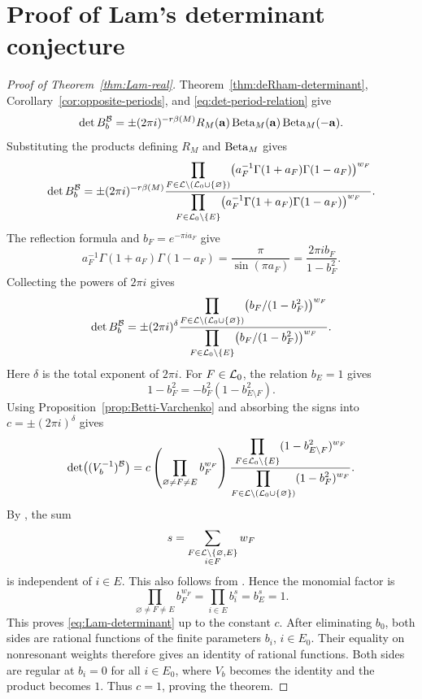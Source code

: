 \section{Proof of Lam's determinant conjecture}\label{sec:determinants}

\begin{proof}[Proof of Theorem~\ref{thm:Lam-real}]

Theorem~\ref{thm:deRham-determinant},
Corollary~\ref{cor:opposite-periods}, and
\eqref{eq:det-period-relation} give
\[
 \det B_b^{\mathcal B}
 =\pm(2\pi i)^{-r\beta(M)}
       R_M(\mathbf a)\operatorname{Beta}_M(\mathbf a)\operatorname{Beta}_M(-\mathbf a).
\]
Substituting the products defining $R_M$ and $\operatorname{Beta}_M$ gives
\[
 \det B_b^{\mathcal B}
 =\pm(2\pi i)^{-r\beta(M)}
 \frac{\displaystyle
   \prod_{F\in\mathcal L\setminus(\mathcal L_0\cup\{\varnothing\})}
      \bigl(a_F^{-1}\Gamma(1+a_F)\Gamma(1-a_F)\bigr)^{w_F}}
      {\displaystyle
   \prod_{F\in\mathcal L_0\setminus\{E\}}
      \bigl(a_F^{-1}\Gamma(1+a_F)\Gamma(1-a_F)\bigr)^{w_F}}.
\]
The reflection formula and $b_F=e^{-\pi i a_F}$ give
\begin{equation}\label{eq:reflection}
 a_F^{-1}\Gamma(1+a_F)\Gamma(1-a_F)
 =\frac{\pi}{\sin(\pi a_F)}
 =\frac{2\pi i b_F}{1-b_F^2}.
\end{equation}
Collecting the powers of $2\pi i$ gives
\[
 \det B_b^{\mathcal B}
 =\pm(2\pi i)^\delta\frac{\displaystyle
      \prod_{F\in\mathcal L\setminus(\mathcal L_0\cup\{\varnothing\})}
          \bigl(b_F/(1-b_F^2)\bigr)^{w_F}}
        {\displaystyle
      \prod_{F\in\mathcal L_0\setminus\{E\}}
          \bigl(b_F/(1-b_F^2)\bigr)^{w_F}}.
\]
Here $\delta$ is the total exponent of $2\pi i$.
For $F\in\mathcal L_0$, the relation $b_E=1$ gives
\[
 1-b_F^2=-b_F^2(1-b_{E\setminus F}^2).
\]
Using Proposition~\ref{prop:Betti-Varchenko} and absorbing the signs
into $c=\pm(2\pi i)^\delta$ gives
\[
 \det\bigl((V_b^{-1})^{\mathcal B}\bigr)
 =c\left(\prod_{\varnothing\ne F\ne E}b_F^{w_F}\right)
 \frac{\displaystyle\prod_{F\in\mathcal L_0\setminus\{E\}}
            (1-b_{E\setminus F}^2)^{w_F}}
      {\displaystyle\prod_{F\in\mathcal L\setminus(\mathcal L_0\cup\{\varnothing\})}
            (1-b_F^2)^{w_F}}.
\]
By \cite[Lemma 2.15]{LopezdeMedranoRinconShaw2020}, the sum
\[
 s=\sum_{\substack{F\in\mathcal L\setminus\{\varnothing,E\}\\i\in F}}w_F
\]
is independent of $i\in E$. This also follows from
\cite[Corollary 2.1.15]{Gioan2002}. Hence the monomial factor is
\[
 \prod_{\varnothing\ne F\ne E}b_F^{w_F}
 =\prod_{i\in E}b_i^s=b_E^s=1.
\]
This proves \eqref{eq:Lam-determinant} up to the constant $c$. After eliminating
$b_0$, both sides are rational functions of the finite parameters
$b_i$, $i\in E_0$. Their equality on nonresonant weights therefore
gives an identity of rational functions. Both sides are regular at
$b_i=0$ for all $i\in E_0$, where $V_b$ becomes the identity and the
product becomes $1$. Thus $c=1$, proving the theorem.
\end{proof}

